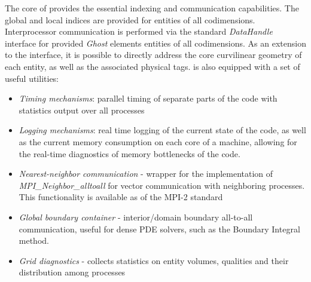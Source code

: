 \noindent
The core of \curvgrid{} provides the essential indexing and communication capabilities. The global and local indices are provided for entities of all codimensions. Interprocessor communication is performed via the \dune{} standard \textit{DataHandle} interface for provided \textit{Ghost} elements entities of all codimensions. As an extension to the \dunegrid{} interface, it is possible to directly address the core curvilinear geometry of each entity, as well as the associated physical tags. \curvgrid{} is also equipped with a set of useful utilities:
\begin{itemize}
    \item \textit{Timing mechanisms}: parallel timing of separate parts of the code with statistics output over all processes
    \item \textit{Logging mechanisms}: real time logging of the current state of the code, as well as the current memory consumption on each core of a machine, allowing for the real-time diagnostics of memory bottlenecks of the code.
    \item \textit{Nearest-neighbor communication} - wrapper for the implementation of \textit{MPI\_Neighbor\_alltoall} for vector communication with neighboring processes. This functionality is available as of the MPI-2 standard \cite{MPI-3.1}
    \item \textit{Global boundary container} - interior/domain boundary all-to-all communication, useful for dense PDE solvers, such as the Boundary Integral method. \cite{kern+2009}
    \item \textit{Grid diagnostics} - collects statistics on entity volumes, qualities and their distribution among processes
\end{itemize}



% 

